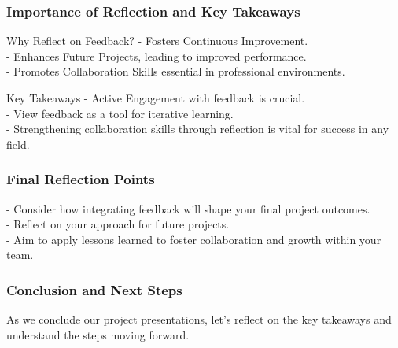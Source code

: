 \documentclass[aspectratio=169]{beamer}
\begin{document}
\begin{frame}[fragile]
    \frametitle{Importance of Reflection and Key Takeaways}
    \begin{block}{Why Reflect on Feedback?}
        - Fosters Continuous Improvement. \\
        - Enhances Future Projects, leading to improved performance. \\
        - Promotes Collaboration Skills essential in professional environments.
    \end{block}

    \begin{block}{Key Takeaways}
        - Active Engagement with feedback is crucial. \\
        - View feedback as a tool for iterative learning. \\
        - Strengthening collaboration skills through reflection is vital for success in any field.
    \end{block}
\end{frame}

\begin{frame}[fragile]
    \frametitle{Final Reflection Points}
    - Consider how integrating feedback will shape your final project outcomes. \\
    - Reflect on your approach for future projects. \\
    - Aim to apply lessons learned to foster collaboration and growth within your team.
\end{frame}

\begin{frame}[fragile]
    \frametitle{Conclusion and Next Steps}
    As we conclude our project presentations, let’s reflect on the key takeaways and understand the steps moving forward.
\end{frame}
\end{document}
